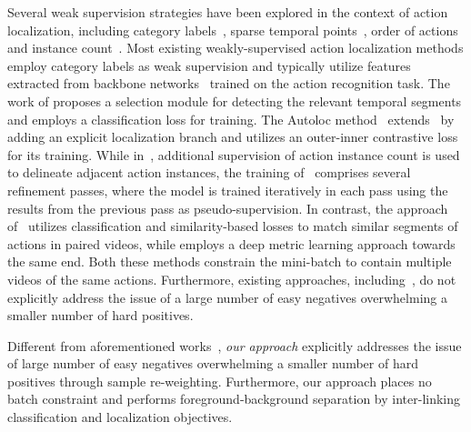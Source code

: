 \documentclass[final]{cvpr}
\begin{document}
Several weak supervision strategies have been explored in the context of action localization, including category labels~\cite{hideseek,stpn,untrimnets,wtalc,autoloc}, sparse temporal points~\cite{point-supervision}, order of actions~\cite{order-constraints-kuehne,order-constraints-bojan} and instance count~\cite{3cnet,star}. 
Most existing weakly-supervised action localization methods employ category labels as weak supervision and typically utilize features extracted from backbone networks~\cite{tsn,kinetics} trained on the action recognition task. 
The work of \cite{untrimnets} proposes a selection module for detecting the relevant temporal segments and employs a classification loss for training. 
The Autoloc method~\cite{autoloc} extends~\cite{untrimnets} by adding an explicit localization branch and utilizes an outer-inner contrastive loss for its training.
While in~\cite{3cnet}, additional supervision of action instance count is used to delineate adjacent action instances, the training of~\cite{refineloc,zhai2020twostream} comprises several refinement passes, where the model is trained iteratively in each pass using the results from the previous pass as pseudo-supervision.
In contrast, the approach of~\cite{wtalc} utilizes classification and similarity-based losses to match similar segments of actions in paired videos, while \cite{dml} employs a deep metric learning approach towards the same end. Both these methods constrain the mini-batch to contain multiple videos of the same actions. Furthermore, existing approaches, including~\cite{wtalc,dml}, do not explicitly address the issue of a large number of easy negatives overwhelming a smaller number of hard positives. 

Different from aforementioned works~\cite{wtalc,untrimnets,3cnet,dml}, \textit{our approach} explicitly addresses the issue of large number of easy negatives overwhelming a smaller number of hard positives through sample re-weighting. Furthermore, our approach places no batch constraint and performs foreground-background separation by inter-linking classification and localization objectives.
\end{document}
